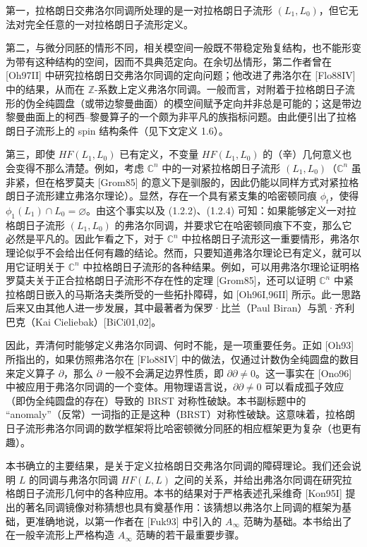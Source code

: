 第一，拉格朗日交弗洛尔同调所处理的是一对拉格朗日子流形 $(L_1,L_0)$，但它无法对完全任意的一对拉格朗日子流形定义。

第二，与微分同胚的情形不同，相关模空间一般既不带稳定殆复结构，也不能形变为带有这种结构的空间，因而不具典范定向。在余切丛情形，第二作者曾在 [Oh97II] 中研究拉格朗日交弗洛尔同调的定向问题；他改进了弗洛尔在 [Flo88IV] 中的结果，从而在 $\mathbb Z$-系数上定义弗洛尔同调。一般而言，对附着于拉格朗日子流形的伪全纯圆盘（或带边黎曼曲面）的模空间赋予定向并非总是可能的；这是带边黎曼曲面上的柯西--黎曼算子的一个颇为非平凡的族指标问题。由此便引出了拉格朗日子流形上的 spin 结构条件（见下文定义 1.6）。

第三，即使 $HF(L_1,L_0)$ 已有定义，不变量 $HF(L_1,L_0)$ 的（辛）几何意义也会变得不那么清楚。例如，考虑 $\mathbb C^n$ 中的一对紧拉格朗日子流形 $(L_1,L_0)$（$\mathbb C^n$ 虽非紧，但在格罗莫夫 [Grom85] 的意义下是驯服的，因此仍能以同样方式对紧拉格朗日子流形建立弗洛尔理论）。显然，存在一个具有紧支集的哈密顿同痕 $\phi_t$，使得 $\phi_1(L_1)\cap L_0=\varnothing$。由这个事实以及 (1.2.2)、(1.2.4) 可知：如果能够定义一对拉格朗日子流形 $(L_1,L_0)$ 的弗洛尔同调，并要求它在哈密顿同痕下不变，那么它必然是平凡的。因此乍看之下，对于 $\mathbb C^n$ 中拉格朗日子流形这一重要情形，弗洛尔理论似乎不会给出任何有趣的结论。然而，只要知道弗洛尔理论已有定义，就可以用它证明关于 $\mathbb C^n$ 中拉格朗日子流形的各种结果。例如，可以用弗洛尔理论证明格罗莫夫关于正合拉格朗日子流形不存在性的定理 [Grom85]，还可以证明 $\mathbb C^n$ 中紧拉格朗日嵌入的马斯洛夫类所受的一些拓扑障碍，如 [Oh96I,96II] 所示。此一思路后来又由其他人进一步发展，其中最著者为保罗·比兰（Paul Biran）与凯·齐利巴克（Kai Cieliebak）[BiCi01,02]。

因此，弄清何时能够定义弗洛尔同调、何时不能，是一项重要任务。正如 [Oh93] 所指出的，如果仿照弗洛尔在 [Flo88IV] 中的做法，仅通过计数伪全纯圆盘的数目来定义算子 $\partial$，那么 $\partial$ 一般不会满足边界性质，即 $\partial\partial\neq0$。这一事实在 [Ono96] 中被应用于弗洛尔同调的一个变体。用物理语言说，$\partial\partial\neq0$ 可以看成孤子效应（即伪全纯圆盘的存在）导致的 BRST 对称性破缺。本书副标题中的 ``anomaly''（反常）一词指的正是这种（BRST）对称性破缺。这意味着，拉格朗日子流形弗洛尔同调的数学框架将比哈密顿微分同胚的相应框架更为复杂（也更有趣）。

本书确立的主要结果，是关于定义拉格朗日交弗洛尔同调的障碍理论。我们还会说明 $L$ 的同调与弗洛尔同调 $HF(L,L)$ 之间的关系，并给出弗洛尔同调在研究拉格朗日子流形几何中的各种应用。本书的结果对于严格表述孔采维奇 [Kon95I] 提出的著名同调镜像对称猜想也具有奠基作用：该猜想以弗洛尔上同调的框架为基础，更准确地说，以第一作者在 [Fuk93] 中引入的 $A_\infty$ 范畴为基础。本书给出了在一般辛流形上严格构造 $A_\infty$ 范畴的若干最重要步骤。

